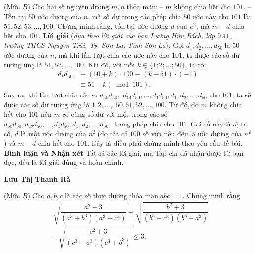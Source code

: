 \begin{multicols}{2}
\begin{flushright}
	\end{flushright}
	{}
	(Mức $B$) Cho hai số nguyên dương $m, n$ thỏa mãn:
	\vskip 0.05cm
	-- $m$ không chia hết cho $101$.
	\vskip 0.05cm
	-- Tồn tại $50$ ước dương của $n$, mà số dư trong các phép chia $50$ ước này cho $101$ là: $51, 52, 53, \ldots, 100.$ 
	\vskip 0.05cm
	Chứng minh rằng, tồn tại ước dương $d$ của $n^2$, mà $m-d$ chia hết cho $101$.
	\vskip 0.05cm
	\textbf{\color{thachthuctoanhoc}Lời giải} (\textit{dựa theo lời giải của bạn Lương Hữu Bách, lớp $9$A$1$, trường THCS Nguyễn Trãi, Tp. Sơn La, Tỉnh Sơn La})\textbf{\color{thachthuctoanhoc}.}
	\vskip 0.05cm
	Gọi $d_1, d_2, \ldots, d_{50}$ là $50$ ước dương của $n$, mà khi lần lượt chia các ước này cho $101$, ta được các số dư tương ứng là $51, 52, \ldots, 100$.
	\vskip 0.05cm
	Khi đó, với mỗi $k \in \{1; 2; \ldots; 50\}$, ta có:
	\begin{align*}
		{d_k}{d_{50}} &\equiv \left( {50 + k} \right) \cdot 100 \equiv \left( {k - 51} \right) \cdot \left( { - 1} \right) \\
		&\equiv 51 - k\left( {\bmod 101} \right).
	\end{align*}
	Suy ra, khi lần lượt chia các số  ${d_{50}}{d_{50}},$ ${d_{49}}{d_{50}}, \ldots,{d_1}{d_{50}},d_1, d_2,\ldots,d_{50}$   cho $101$, ta sẽ được các số dư tương ứng là $1, 2,\ldots,$ $50, 51, 52, \ldots, 100$.
	\vskip 0.05cm
	Từ đó, do $m$ không chia hết cho $101$ nên $m$ có cùng số dư với một trong các số  $d_{50}d_{50},d_{49}d_{50}, \ldots,d_1d_{50},d_1,d_2, \ldots,d_{50},$ trong phép chia cho $101$. Gọi số này là $d$; ta có, $d$ là một ước dương của $n^2$ (do tất cả $100$ số vừa nêu đều là ước dương của $n^2$) và $m - d$ chia hết cho $101$. Đây là điều phải chứng minh theo yêu cầu đề bài.
	\vskip 0.05cm
	\textbf{\color{thachthuctoanhoc}Bình luận và Nhận xét}
	\vskip 0.05cm
	Tất cả các lời giải, mà Tạp chí đã nhận được từ bạn đọc, đều là lời giải đúng và hoàn chỉnh.
	\begin{flushright}
		\textbf{\color{thachthuctoanhoc}Lưu Thị Thanh Hà}
	\end{flushright}
	{}
	(Mức $B$) Cho $a, b, c$ là các số thực dương thỏa mãn $a b c=1$. Chứng minh rằng
	\begin{align*}
		&\sqrt{\dfrac{a^2\!+\!3}{\left(a^3\!+\!b^3\right)\!\left(a^3\!+\!c^3\right)}}\!+\!\sqrt{\dfrac{b^2\!+\!3}{\left(b^3\!+\!c^3\right)\!\left(b^3\!+\!a^3\right)}}\\
		&+\sqrt{\dfrac{c^2\!+\!3}{\left(c^3\!+\!a^3\right)\!\left(c^3\!+\!b^3\right)}} \leq 3.

\end{align*}
\end{multicols}

